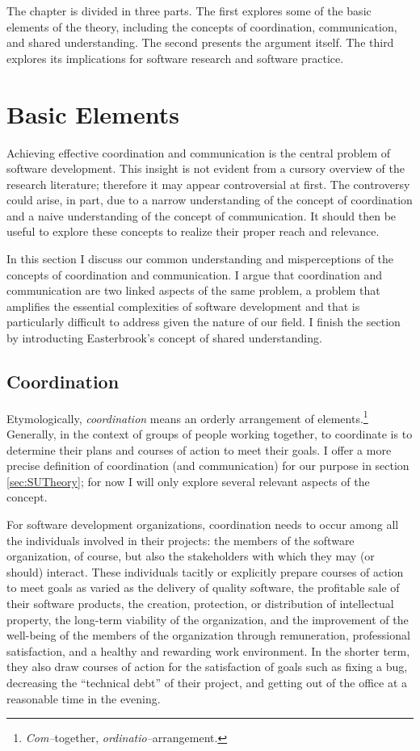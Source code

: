 The chapter is divided in three parts. The first explores some of the basic elements of the theory, including the concepts of coordination, communication, and shared understanding. The second presents the argument itself. The third explores its implications for software research and software practice.


\section{Basic Elements}

Achieving effective coordination and communication is the central problem of software development. This insight is not evident from a cursory overview of the research literature; therefore it may appear controversial at first. The controversy could arise, in part, due to a narrow understanding of the concept of coordination and a naive understanding of the concept of communication. It should then be useful to explore these concepts to realize their proper reach and relevance.

In this section I discuss our common understanding and misperceptions of the concepts of coordination and communication. I argue that coordination and communication are two linked aspects of the same problem, a problem that amplifies the essential complexities of software development and that is particularly difficult to address given the nature of our field. I finish the section by introducting Easterbrook's  concept of shared understanding.


\subsection{Coordination}

Etymologically, \emph{coordination} means an orderly arrangement of elements.\footnote{\emph{Com--}together, \emph{ordinatio--}arrangement.} Generally, in the context of groups of people working together, to coordinate is to determine their plans and courses of action to meet their goals. I offer a more precise definition of coordination (and communication) for our purpose in section \ref{sec:SUTheory}; for now I will only explore several relevant aspects of the concept.

For software development organizations, coordination needs to occur among all the individuals involved in their projects: the members of the software organization, of course, but also the stakeholders with which they may (or should) interact. These individuals tacitly or explicitly prepare courses of action to meet goals as varied as the delivery of quality software, the profitable sale of their software products, the creation, protection, or distribution of intellectual property, the long-term viability of the organization, and the improvement of the well-being of the members of the organization through remuneration, professional satisfaction, and a healthy and rewarding work environment. In the shorter term, they also draw courses of action for the satisfaction of goals such as fixing a bug, decreasing the ``technical debt'' of their project, and getting out of the office at a reasonable time in the evening.

